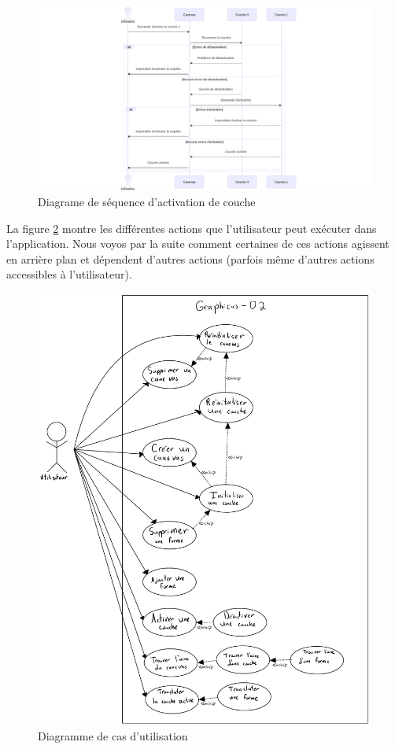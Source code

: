 \documentclass[a11paper, 11pt]{article}
\begin{document}
\begin{figure}[H] %
\centering
\caption{Diagrame de séquence d'activation de couche}\label{fig:sequence}
\includegraphics[width=\textwidth]{sequence.png}
\end{figure} %


La figure \ref{fig:usecase} montre les différentes actions que l'utilisateur
peut exécuter dans l'application. Nous voyos par la suite comment certaines de
ces actions agissent en arrière plan et dépendent d'autres actions (parfois
même d'autres actions accessibles à l'utilisateur).

\begin{figure}[H]
\centering\caption{Diagramme de cas d'utilisation}\label{fig:usecase}
\includegraphics[width=\textwidth]{usecase.png}
\end{figure}
\end{document}
